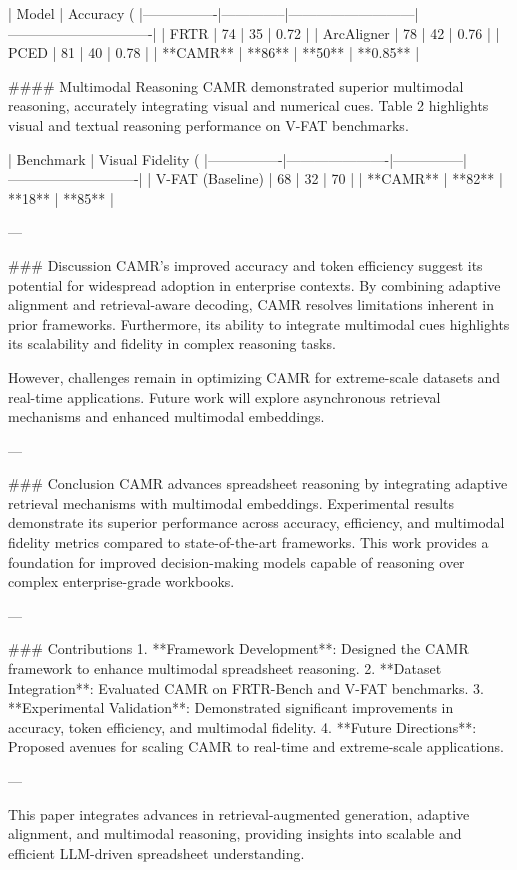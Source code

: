 | Model          | Accuracy (%
|----------------|--------------|---------------------------|-------------------------------|  
| FRTR           | 74           | 35                        | 0.72                          |  
| ArcAligner     | 78           | 42                        | 0.76                          |  
| PCED           | 81           | 40                        | 0.78                          |  
| **CAMR**       | **86**       | **50**                    | **0.85**                      |  

#### Multimodal Reasoning  
CAMR demonstrated superior multimodal reasoning, accurately integrating visual and numerical cues. Table 2 highlights visual and textual reasoning performance on V-FAT benchmarks.  

| Benchmark      | Visual Fidelity (%
|----------------|----------------------|---------------|----------------------------|  
| V-FAT (Baseline) | 68                   | 32            | 70                         |  
| **CAMR**       | **82**               | **18**        | **85**                     |  

---

### Discussion  
CAMR's improved accuracy and token efficiency suggest its potential for widespread adoption in enterprise contexts. By combining adaptive alignment and retrieval-aware decoding, CAMR resolves limitations inherent in prior frameworks. Furthermore, its ability to integrate multimodal cues highlights its scalability and fidelity in complex reasoning tasks.

However, challenges remain in optimizing CAMR for extreme-scale datasets and real-time applications. Future work will explore asynchronous retrieval mechanisms and enhanced multimodal embeddings.

---

### Conclusion  
CAMR advances spreadsheet reasoning by integrating adaptive retrieval mechanisms with multimodal embeddings. Experimental results demonstrate its superior performance across accuracy, efficiency, and multimodal fidelity metrics compared to state-of-the-art frameworks. This work provides a foundation for improved decision-making models capable of reasoning over complex enterprise-grade workbooks.

---

### Contributions  
1. **Framework Development**: Designed the CAMR framework to enhance multimodal spreadsheet reasoning.  
2. **Dataset Integration**: Evaluated CAMR on FRTR-Bench and V-FAT benchmarks.  
3. **Experimental Validation**: Demonstrated significant improvements in accuracy, token efficiency, and multimodal fidelity.  
4. **Future Directions**: Proposed avenues for scaling CAMR to real-time and extreme-scale applications.  

--- 

This paper integrates advances in retrieval-augmented generation, adaptive alignment, and multimodal reasoning, providing insights into scalable and efficient LLM-driven spreadsheet understanding.